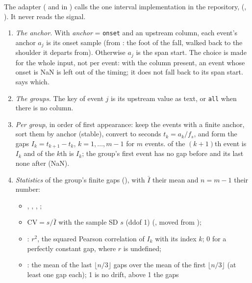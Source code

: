 The adapter ( and  in )
calls the one interval implementation in the repository,
 (,
). It never reads the signal.

\begin{enumerate}
\item \emph{The anchor.} With \emph{anchor} = \texttt{onset} and an upstream
   column, each event's anchor $a_j$ is its onset sample (from
  : the foot of the fall, walked back to the shoulder it
  departs from). Otherwise $a_j$ is the span start. The choice is made for the whole input,
  not per event: with the column present, an event whose onset is NaN is left out of the
  timing; it does not fall back to its span start.  says which.
\item \emph{The groups.} The key of event $j$ is its upstream  value as text, or
  \texttt{all} when there is no  column.
\item \emph{Per group}, in order of first appearance: keep the events with a finite anchor,
  sort them by anchor (stable), convert to seconds $t_k = a_k / f_s$, and form the gaps
  $I_k = t_{k+1} - t_k$, $k = 1,\dots,m-1$ for $m$ events.
   of the $(k{+}1)$th event is $I_k$ and  of
  the $k$th is $I_k$; the group's first event has no gap before and its last none after
  (NaN).
\item \emph{Statistics} of the group's finite gaps (), with
  $\bar I$ their mean and $n = m-1$ their number:
  \begin{itemize}
  \item {}, , , ;
  \item $\mathrm{CV} = s/\bar I$ with the sample SD $s$ (ddof 1) (,
    moved from );
  \item {}: $r^2$, the squared Pearson correlation of $I_k$ with its index $k$;
    0 for a perfectly constant gap, where $r$ is undefined;
  \item {}: the mean of the last $\lfloor n/3 \rfloor$ gaps over the mean of
    the first $\lfloor n/3 \rfloor$ (at least one gap each); 1 is no drift, above 1 the gaps

\end{itemize}
\end{enumerate}
